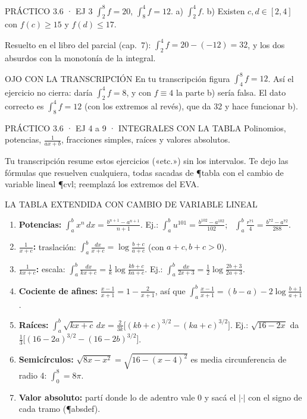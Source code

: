 \begin{enunciado}{PRÁCTICO 3.6 · EJ 3}
$\int_2^8f=20$, $\int_8^4f=12$. a) $\int_2^4f$. b) Existen $c,d\in[2,4]$ con $f(c)\ge15$ y $f(d)\le17$.
\end{enunciado}
Resuelto en el libro del parcial (cap.\ 7): $\int_2^4f=20-(-12)=32$, y los dos absurdos con la monotonía de la integral.
\begin{trampa}{OJO CON LA TRANSCRIPCIÓN}
En tu transcripción figura $\int_4^8f=12$. Así el ejercicio no cierra: daría $\int_2^4f=8$, y con $f\equiv4$ la parte b) sería falsa. El dato correcto es $\int_8^4f=12$ (con los extremos al revés), que da 32 y hace funcionar b).
\end{trampa}

\begin{enunciado}{PRÁCTICO 3.6 · EJ 4 a 9 · INTEGRALES CON LA TABLA}
Polinomios, potencias, $\frac1{ax+b}$, fracciones simples, raíces y valores absolutos.
\end{enunciado}
\begin{falta}
Tu transcripción resume estos ejercicios («etc.») sin los intervalos. Te dejo las fórmulas que resuelven cualquiera, todas sacadas de \P{tabla} con el cambio de variable lineal \P{cvl}; reemplazá los extremos del EVA.
\end{falta}
\begin{metodo}{LA TABLA EXTENDIDA CON CAMBIO DE VARIABLE LINEAL}
\begin{enumerate}
\item \textbf{Potencias:} $\int_a^bx^n\,dx=\frac{b^{n+1}-a^{n+1}}{n+1}$. Ej.: $\int_a^bu^{101}=\frac{b^{102}-a^{102}}{102}$; \ $\int_a^b\frac{r^{71}}4=\frac{b^{72}-a^{72}}{288}$.
\item \textbf{$\frac1{x+c}$:} traslación: $\int_a^b\frac{dx}{x+c}=\log\frac{b+c}{a+c}$ (con $a+c,b+c>0$).
\item \textbf{$\frac1{kx+c}$:} escala: $\int_a^b\frac{dx}{kx+c}=\frac1k\log\frac{kb+c}{ka+c}$. Ej.: $\int_a^b\frac{dx}{2x+3}=\frac12\log\frac{2b+3}{2a+3}$.
\item \textbf{Cociente de afines:} $\frac{x-1}{x+1}=1-\frac2{x+1}$, así que $\int_a^b\frac{x-1}{x+1}=(b-a)-2\log\frac{b+1}{a+1}$.
\item \textbf{Raíces:} $\int_a^b\sqrt{kx+c}\,dx=\frac2{3k}\big[(kb+c)^{3/2}-(ka+c)^{3/2}\big]$. Ej.: $\sqrt{16-2x}$ da $\frac13\big[(16-2a)^{3/2}-(16-2b)^{3/2}\big]$.
\item \textbf{Semicírculos:} $\sqrt{8x-x^2}=\sqrt{16-(x-4)^2}$ es media circunferencia de radio 4: $\int_0^8=8\pi$.
\item \textbf{Valor absoluto:} partí donde lo de adentro vale 0 y sacá el $|\cdot|$ con el signo de cada tramo (\P{absdef}).
\end{enumerate}
\end{metodo}
